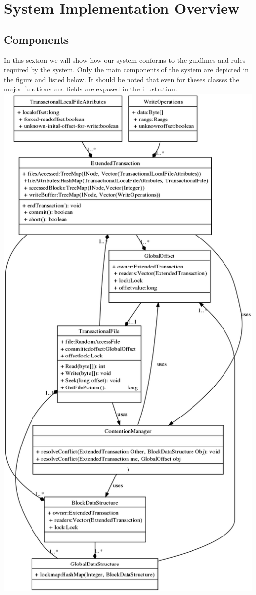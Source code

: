 \documentclass[a4paper, 11pt]{article}
\begin{document}
\section{System Implementation Overview}

\subsection{Components}

In this sextion we will show how our system conforms to the guidlines and rules required by the system. Only the main components of the system are depicted in the figure and listed below. It should be noted that even for theses classes the major functions and fields are exposed in the illustration.\\

\includegraphics[scale = 0.3]{uml.png}\\
\end{document}
